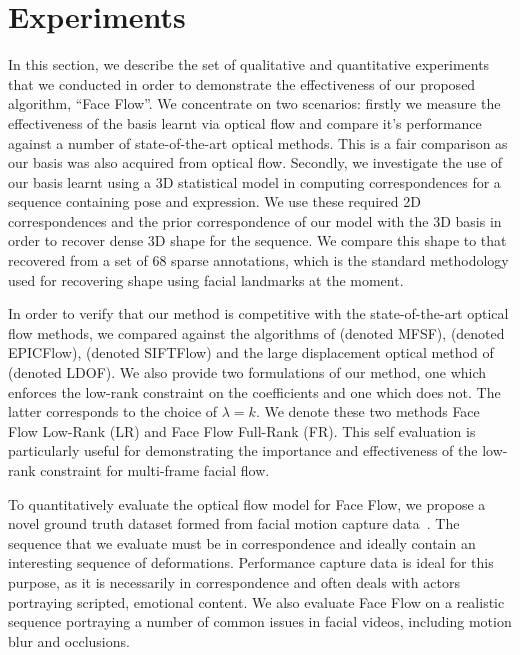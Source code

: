 \section{Experiments}\label{sec:face_flow_experiments}
In this section, we describe the set of qualitative and quantitative experiments
that we conducted in order to demonstrate the effectiveness of our proposed algorithm,
``Face Flow''. We concentrate on two scenarios: firstly we measure the effectiveness
of the basis learnt via optical flow and compare it's performance against
a number of state-of-the-art optical methods. This is a fair comparison as our
basis was also acquired from optical flow. Secondly, we investigate the use
of our basis learnt using a 3D statistical model in computing correspondences
for a sequence containing pose and expression. We use these required 2D correspondences
and the prior correspondence of our model with the 3D basis in order to recover
dense 3D shape for the sequence. We compare this shape to that recovered from
a set of 68 sparse annotations, which is the standard methodology used for recovering
shape using facial landmarks at the moment.

In order to verify that our method is competitive with the state-of-the-art
optical flow methods,
we compared against the algorithms of
\citet{garg2013variational} (denoted MFSF),
\citet{revaud2015epicflow} (denoted EPICFlow),
\citet{liu2011sift} (denoted SIFTFlow) and the large displacement
optical method of \citet{brox2011large} (denoted LDOF). We also provide two
formulations of our method, one which enforces the low-rank constraint on the coefficients
and one which does not. The latter corresponds to the choice of $\lambda=k$.
We denote these two methods Face Flow Low-Rank (LR) and Face Flow
Full-Rank (FR). This self evaluation is particularly useful for demonstrating the importance
and effectiveness of the low-rank constraint for multi-frame facial flow.

To quantitatively evaluate the optical flow model for Face Flow,
we propose a novel ground truth dataset formed
from facial motion capture data~\cite{zhang2004spacetime}. The sequence that we
evaluate must be in correspondence and ideally contain an interesting
sequence of deformations. Performance capture data is ideal for this purpose, as
it is necessarily in correspondence and often deals with actors portraying
scripted, emotional content. We also evaluate Face Flow on a realistic sequence
portraying a number of common issues in facial videos, including motion blur
and occlusions.

